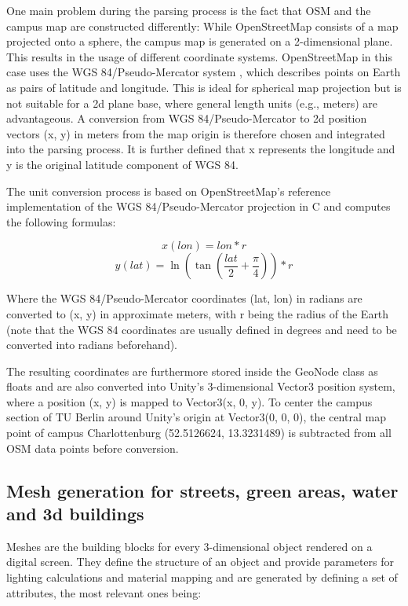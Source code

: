 One main problem during the parsing process is the fact that OSM and the campus map are constructed differently: While OpenStreetMap consists of a map projected onto a sphere, the campus map is generated on a 2-dimensional plane. This results in the usage of different coordinate systems. OpenStreetMap in this case uses the WGS 84/Pseudo-Mercator system \cite{pseudo_mercator_1} \cite{pseudo_mercator_2}, which describes points on Earth as pairs of latitude and longitude. This is ideal for spherical map projection but is not suitable for a 2d plane base, where general length units (e.g., meters) are advantageous. A conversion from WGS 84/Pseudo-Mercator to 2d position vectors (x, y) in meters from the map origin is therefore chosen and integrated into the parsing process. It is further defined that x represents the longitude and y is the original latitude component of WGS 84.

The unit conversion process is based on OpenStreetMap's reference implementation of the WGS 84/Pseudo-Mercator projection \cite{mercator_projection_implementation} in C and computes the following formulas:

\[x(lon) = lon * r\]
\[y(lat) = \ln(\tan(\frac{lat}{2} + \frac{\pi}{4})) * r\]

Where the WGS 84/Pseudo-Mercator coordinates (lat, lon) in radians are converted to (x, y) in approximate meters, with r being the radius of the Earth (note that the WGS 84 coordinates are usually defined in degrees and need to be converted into radians beforehand).

The resulting coordinates are furthermore stored inside the GeoNode class as floats and are also converted into Unity's 3-dimensional Vector3 position system, where a position (x, y) is mapped to Vector3(x, 0, y). To center the campus section of TU Berlin around Unity's origin at Vector3(0, 0, 0), the central map point of campus Charlottenburg (52.5126624, 13.3231489) is subtracted from all OSM data points before conversion.

\subsection{Mesh generation for streets, green areas, water and 3d buildings}
Meshes are the building blocks for every 3-dimensional object rendered on a digital screen. They define the structure of an object and provide parameters for lighting calculations and material mapping and are generated by defining a set of attributes, the most relevant ones being:

